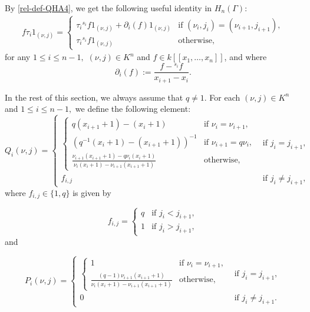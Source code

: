 \documentclass[11pt, reqno]{amsart} \textwidth=14.9cm \oddsidemargin=1cm \evensidemargin=1cm
\theoremstyle{definition}
\numberwithin{equation}{section}
\begin{document}
By \eqref{rel-def-QHA4}, we get the following useful identity in $H_{n}(\Gamma)$:\vspace{0.15cm}
\begin{align}
f\tau_{i}1_{(\nu, j)}=\left\{
\begin{array}{ll}
\tau_{i}{}^{s_{i}}f1_{(\nu, j)}+\partial_{i}(f)1_{(\nu, j)}&\text{if $(\nu_i, j_i)=(\nu_{i+1}, j_{i+1})$},\\[0.2em]
\tau_{i}{}^{s_{i}}f1_{(\nu, j)}&\text{otherwise},
\end{array}
\right.\label{commu-relations}
\end{align}
\vspace{0.15cm}
for any $1\leq i\leq n-1,$ $(\nu, j)\in K^{n}$ and $f\in k[[x_1,\dots,x_n]]$, and where
\begin{equation*}
\partial_{i}(f):=\frac{f-{}^{s_{i}}f}{x_{i+1}-x_{i}}.
\end{equation*}


In the rest of this section, we always assume that $q\neq 1.$ For each $(\nu, j)\in K^{n}$ and $1\leq i\leq n-1,$ we define the following element:
\[Q_{i}(\nu, j)=
\begin{cases}
\begin{cases}
q(x_{i+1}+1)-(x_{i}+1) & \text{if } \nu_i = \nu_{i+1},
\\
\left(q^{-1}(x_{i}+1)-(x_{i+1}+1)\right)^{-1} & \text{if } \nu_{i+1} =q\nu_{i},
\\
\frac{\nu_{i+1}(x_{i+1}+1)-q\nu_{i}(x_{i}+1)}
{\nu_{i}(x_{i}+1)-\nu_{i+1}(x_{i+1}+1)}
 & \text{otherwise,}
\end{cases}
& \text{if } j_i = j_{i+1},
\\
f_{i, j} & \text{if } j_i \neq j_{i+1},
\end{cases}
\]
\setlength{\parskip}{2pt}where $f_{i,j}\in \{1, q\}$ is given by

\[f_{i, j}=
\begin{cases}
q & \text{if } j_i < j_{i+1},
\\[0.1em]
1& \text{if } j_i > j_{i+1},
\end{cases}
\]
and

\[P_{i}(\nu, j)=
\begin{cases}
\begin{cases}
1 & \text{if } \nu_i = \nu_{i+1},
\\
\frac{(q-1)\nu_{i+1}(x_{i+1}+1)}{\nu_{i}(x_{i}+1)-\nu_{i+1}(x_{i+1}+1)}
 & \text{otherwise,}
\end{cases}
& \text{if } j_i = j_{i+1},
\\
0 & \text{if } j_i \neq j_{i+1}.
\end{cases}
\]
\end{document}
